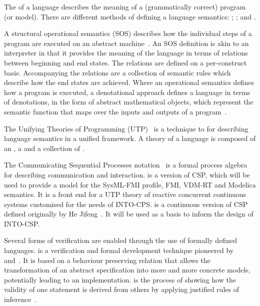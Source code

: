 The  of a language describes the meaning of a (grammatically correct) program~\cite{Nielson&92} (or model). There are different methods of defining a language semantics: ; ; and .

A structural operational semantics (SOS) describes how the individual steps of a program are executed on an abstract machine~\cite{Plotkin81}. An SOS definition is akin to an interpreter in that it provides the meaning of the language in terms of relations between beginning and end states. The relations are defined on a per-construct basis. Accompanying the relations are a collection of semantic rules which describe how the end states are achieved. Where an operational semantics defines how a program is executed, a denotational approach defines a language in terms of denotations, in the form of abstract mathematical objects, which represent the semantic function that maps over the inputs and outputs of a program~\cite{Scott&71}.

The Unifying Theories of Programming (UTP)~ \cite{Hoare&98} is a technique to for describing language semantics in a unified framework. A theory of a language is composed of an , a  and a collection of .

The Communicating Sequential Processes  notation~\cite{Hoare85} is a formal process algebra for describing  communication  and interaction.
 is a version of CSP, which will be used to provide a model for the SysML-FMI profile, FMI, VDM-RT and Modelica semantics. It is a front end for a UTP theory of reactive concurrent continuous systems customised for the needs of INTO-CPS.  is a continuous version of CSP defined originally by He Jifeng~\cite{Jifeng94}. It will be used as a basis to inform the design of INTO-CSP.

Several forms of verification are enabled through the use of formally defined languages.   is a verification and formal development technique pioneered by~\cite{Back&98} and~\cite{Morgan90a}. It is based on a behaviour preserving relation that allows the transformation of an abstract specification into more and more concrete models, potentially leading to an implementation.  is the process of showing how the validity of one statement is derived from others by applying justified rules of inference~\cite{Bicarregui&94}.

